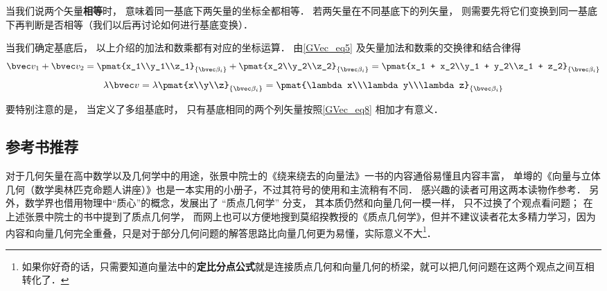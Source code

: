 当我们说两个矢量\textbf{相等}时， 意味着同一基底下两矢量的坐标全都相等． 若两矢量在不同基底下的列矢量， 则需要先将它们变换到同一基底下再判断是否相等（我们以后再讨论如何进行基底变换）．

当我们确定基底后， 以上介绍的加法和数乘都有对应的坐标运算． 由\autoref{GVec_eq5} 及矢量加法和数乘的交换律和结合律得
\begin{equation}\label{GVec_eq8}
\bvec v_1 + \bvec v_2 = \pmat{x_1\\y_1\\z_1}_{\{\bvec\beta_i\}} + \pmat{x_2\\y_2\\z_2}_{\{\bvec\beta_i\}} = \pmat{x_1 + x_2\\y_1 + y_2\\z_1 + z_2}_{\{\bvec\beta_i\}}
\end{equation}
\begin{equation}\label{GVec_eq9}
\lambda \bvec v = \lambda\pmat{x\\y\\z}_{\{\bvec\beta_i\}} = \pmat{\lambda x\\\lambda y\\\lambda z}_{\{\bvec\beta_i\}}
\end{equation}

要特别注意的是， 当定义了多组基底时， 只有基底相同的两个列矢量按照\autoref{GVec_eq8} 相加才有意义．

\subsection{参考书推荐}
对于几何矢量在高中数学以及几何学中的用途，张景中院士的《绕来绕去的向量法》一书的内容通俗易懂且内容丰富， 单墫的《向量与立体几何（数学奥林匹克命题人讲座）》也是一本实用的小册子，不过其符号的使用和主流稍有不同． 感兴趣的读者可用这两本读物作参考． 另外，数学界也借用物理中“质心”的概念，发展出了 “质点几何学” 分支， 其本质仍然和向量几何一模一样， 只不过换了个观点看问题； 在上述张景中院士的书中提到了质点几何学， 而网上也可以方便地搜到莫绍揆教授的《质点几何学》，但并不建议读者花太多精力学习，因为内容和向量几何完全重叠，只是对于部分几何问题的解答思路比向量几何更为易懂，实际意义不大\footnote{如果你好奇的话，只需要知道向量法中的\textbf{定比分点公式}就是连接质点几何和向量几何的桥梁，就可以把几何问题在这两个观点之间互相转化了．}．
